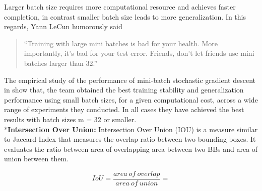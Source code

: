 Larger batch size requires more computational resource and achieves faster completion, in contrast smaller batch size leads to more generalization. In this regards, Yann  LeCun humorously said
\begin{quote}
``Training with large mini batches is bad for your health. More importantly, it's bad for your test error.  Friends, don't let friends use mini batches larger than 32.''
\end{quote}   
The empirical study of the performance of mini-batch stochastic gradient descent in \cite{masters2018revisiting} show that, the team obtained the best training stability and generalization performance using small batch sizes, for a given computational cost, across a wide range of experiments they conducted. In all cases they have achieved the best results with batch sizes m = 32 or smaller.
\\*\textbf{Intersection Over Union:}
Intersection Over Union (IOU) is a measure similar to Jaccard Index that measures the overlap ratio between two bounding boxes. It evaluates the ratio between area of  overlapping area between two BBs and area of union between them.

\begin{equation}
    IoU = \frac{area\: of\: overlap} {area\: of\: union} =
\end{equation}

\begin{center}

\vspace{0.2cm}%

\end{center}

